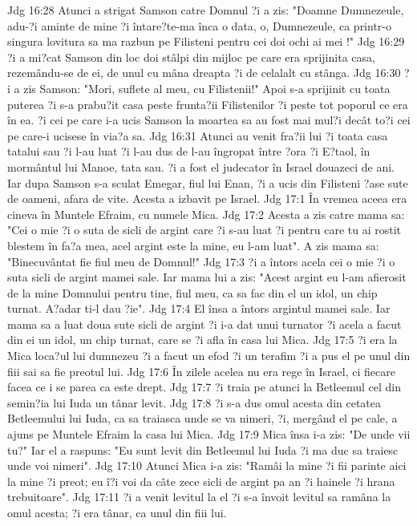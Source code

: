 Jdg 16:28  Atunci a strigat Samson catre Domnul ?i a zis: "Doamne Dumnezeule, adu-?i aminte de mine ?i întare?te-ma înca o data, o, Dumnezeule, ca printr-o singura lovitura sa ma razbun pe Filisteni pentru cei doi ochi ai mei !"
Jdg 16:29  ?i a mi?cat Samson din loc doi stâlpi din mijloc pe care era sprijinita casa, rezemându-se de ei, de unul cu mâna dreapta ?i de celalalt cu stânga.
Jdg 16:30  ?i a zis Samson: "Mori, suflete al meu, cu Filistenii!" Apoi s-a sprijinit cu toata puterea ?i s-a prabu?it casa peste frunta?ii Filistenilor ?i peste tot poporul ce era în ea. ?i cei pe care i-a ucis Samson la moartea sa au fost mai mul?i decât to?i cei pe care-i ucisese în via?a sa.
Jdg 16:31  Atunci au venit fra?ii lui ?i toata casa tatalui sau ?i l-au luat ?i l-au dus de l-au îngropat între ?ora ?i E?taol, în mormântul lui Manoe, tata sau. ?i a fost el judecator în Israel douazeci de ani. Iar dupa Samson s-a sculat Emegar, fiul lui Enan, ?i a ucis din Filisteni ?ase sute de oameni, afara de vite. Acesta a izbavit pe Israel.
Jdg 17:1  În vremea aceea era cineva în Muntele Efraim, cu numele Mica.
Jdg 17:2  Acesta a zis catre mama sa: "Cei o mie ?i o suta de sicli de argint care ?i s-au luat ?i pentru care tu ai rostit blestem în fa?a mea, acel argint este la mine, eu l-am luat". A zis mama sa: "Binecuvântat fie fiul meu de Domnul!"
Jdg 17:3  ?i a întors acela cei o mie ?i o suta sicli de argint mamei sale. Iar mama lui a zis: "Acest argint eu l-am afierosit de la mine Domnului pentru tine, fiul meu, ca sa fac din el un idol, un chip turnat. A?adar ti-l dau ?ie".
Jdg 17:4  El însa a întors argintul mamei sale. Iar mama sa a luat doua sute sicli de argint ?i i-a dat unui turnator ?i acela a facut din ei un idol, un chip turnat, care se ?i afla în casa lui Mica.
Jdg 17:5  ?i era la Mica loca?ul lui dumnezeu ?i a facut un efod ?i un terafim ?i a pus el pe unul din fiii sai sa fie preotul lui.
Jdg 17:6  În zilele acelea nu era rege în Israel, ci fiecare facea ce i se parea ca este drept.
Jdg 17:7  ?i traia pe atunci la Betleemul cel din semin?ia lui Iuda un tânar levit.
Jdg 17:8  ?i s-a dus omul acesta din cetatea Betleemului lui Iuda, ca sa traiasca unde se va nimeri, ?i, mergând el pe cale, a ajuns pe Muntele Efraim la casa lui Mica.
Jdg 17:9  Mica însa i-a zis: "De unde vii tu?" Iar el a raspuns: "Eu sunt levit din Betleemul lui Iuda ?i ma duc sa traiesc unde voi nimeri".
Jdg 17:10  Atunci Mica i-a zis: "Ramâi la mine ?i fii parinte aici la mine ?i preot; eu î?i voi da câte zece sicli de argint pa an ?i hainele ?i hrana trebuitoare".
Jdg 17:11  ?i a venit levitul la el ?i s-a învoit levitul sa ramâna la omul acesta; ?i era tânar, ca unul din fiii lui.
